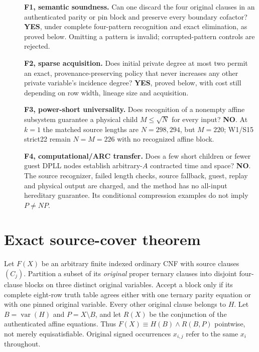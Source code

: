 \documentclass[11pt]{article}
\begin{document}
\begin{description}
\item[]\textbf{F1, semantic soundness.} Can one discard the four original clauses in an authenticated parity or pin block and preserve every boundary cofactor? \textbf{YES}, under complete four-pattern recognition and exact elimination, as proved below. Omitting a pattern is invalid; corrupted-pattern controls are rejected.
\item[]\textbf{F2, sparse acquisition.} Does initial private degree at most two permit an exact, provenance-preserving policy that never increases any other private variable's incidence degree? \textbf{YES}, proved below, with cost still depending on row width, lineage size and acquisition.
\item[]\textbf{F3, power-short universality.} Does recognition of a nonempty affine subsystem guarantee a physical child $M\le\sqrt N$ for every input? \textbf{NO}. At $k=1$ the matched source lengths are $N=298,294$, but $M=220$; W1/S15 strict22 remain $N=M=226$ with no recognized affine block.
\item[]\textbf{F4, computational/ARC transfer.} Does a few short children or fewer guest DPLL nodes establish arbitrary-$A$ contracted time and space? \textbf{NO}. The source recognizer, failed length checks, source fallback, guest, replay and physical output are charged, and the method has no all-input hereditary guarantee. Its conditional compression examples do not imply $P\ne NP$.
\end{description}

\section{Exact source-cover theorem}
Let $F(X)$ be an arbitrary finite indexed ordinary CNF with source clauses $(C_j)$. Partition a subset of its \emph{original} proper ternary clauses into disjoint four-clause blocks on three distinct original variables. Accept a block only if its complete eight-row truth table agrees either with one ternary parity equation or with one pinned original variable. Every other original clause belongs to $H$. Let $B=\operatorname{var}(H)$ and $P=X\setminus B$, and let $R(X)$ be the conjunction of the authenticated affine equations. Thus $F(X)\equiv H(B)\land R(B,P)$ pointwise, not merely equisatisfiable. Original signed occurrences $x_{i,j}$ refer to the same $x_i$ throughout.
\end{document}
